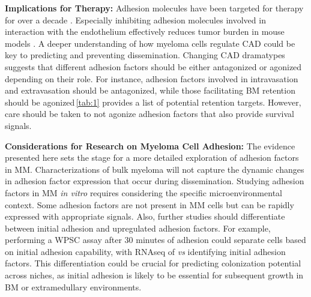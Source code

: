\textbf{Implications for Therapy:}
Adhesion molecules have been targeted for therapy for over a decade
\cite{nairChapterSixEmerging2012, neriTargetingAdhesionMolecules2012}.
Especially inhibiting adhesion molecules involved in interaction with the
endothelium effectively reduces tumor burden in mouse models
\cite{asosinghUniquePathwayHoming2001a,
      mrozikTherapeuticTargetingNcadherin2015}. A deeper understanding of how myeloma
cells regulate \ac{CAD} could be key to predicting and preventing
dissemination. Changing \ac{CAD} dramatypes suggests that different adhesion factors
should be either antagonized or agonized depending on their role. For instance,
adhesion factors involved in intravasation and extravasation should be
antagonized, while those facilitating BM retention should be
agonized\,\textemdash\autoref{tab:1} provides a list of potential retention
targets. However, care should be taken to not agonize adhesion factors that also
provide survival signals.



\textbf{Considerations for Research on Myeloma Cell Adhesion:}
The evidence presented here sets the stage for a more detailed exploration of
adhesion factors in MM. Characterizations of bulk myeloma will not capture
the dynamic changes in adhesion factor expression that occur during dissemination.
Studying adhesion factors in MM \textit{in vitro} requires considering the
specific microenvironmental context. Some adhesion factors are not present in MM
cells but can be rapidly expressed with appropriate signals. Also, further
studies should differentiate between initial adhesion and upregulated adhesion
factors. For example, performing a \ac{WPSC} assay after 30 minutes of adhesion
could separate  cells based on initial adhesion capability, with RNAseq of
\nMAina \textit{vs} \MAina identifying initial adhesion factors. This
differentiation could be crucial for predicting colonization potential across
niches, as initial adhesion is likely to be essential for subsequent growth in
\ac{BM} or extramedullary environments.



